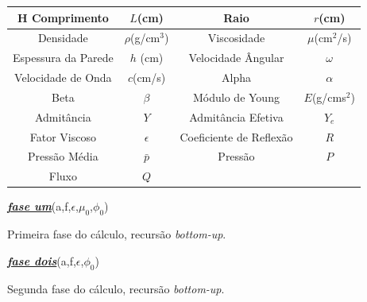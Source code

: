 \documentclass[
        english,			
        brazil			        %
        ,<...>]{abntbibufjf}
\begin{document}
\begin{tabular}{|c|c|c|c|}{H}
	\hline
	Comprimento & $L$(cm) & Raio & $r$(cm) \\
	\hline
	Densidade & $\rho$(g/cm$^3$) & Viscosidade & $\mu$(cm$^2$/s) \\
	\hline
	Espessura da Parede & $h$ (cm) & Velocidade Ângular & $\omega$  \\
	\hline
	Velocidade de Onda & $c$(cm/s) & Alpha & $\alpha$ \\
	\hline
	Beta & $\beta$ & Módulo de Young & $E$(g/cms$^2$)\\
	\hline
	Admitância & $Y$ & Admitância Efetiva & $Y_e$\\
	\hline
	Fator Viscoso & $\epsilon$ & Coeficiente de Reflexão & $R$ \\
	\hline
	Pressão Média & $\bar{p}$ & Pressão & $P$\\
	\hline
	Fluxo & $Q$ && \\
	\hline
\end{tabular}

\begin{algorithm}[H]
	\textbf{\textit{\textsl{\underline{fase um}}}}(a,f,$\epsilon$,$\mu_0$,$\phi_0$)
	\caption{Primeira fase do cálculo, recursão \textit{bottom-up}.}
\end{algorithm}

\begin{algorithm}[H]
\textbf{\textit{\textsl{\underline{fase dois}}}}(a,f,$\epsilon$,$\phi_0$)
\caption{Segunda fase do cálculo, recursão \textit{bottom-up}.}
\end{algorithm}
\end{document}
